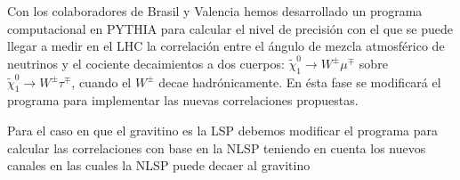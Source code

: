 \begin{itemize}
\begin{proyecto}
  Con los colaboradores de Brasil y Valencia hemos desarrollado un
  programa computacional en PYTHIA para calcular el nivel de precisión
  con el que se puede llegar a medir en el LHC la correlación entre el
  ángulo de mezcla atmosférico de neutrinos y el cociente decaimientos
  a dos cuerpos: $\tilde\chi_1^0\to W^\pm\mu^\mp$ sobre
  $\tilde\chi_1^0\to W^\pm\tau^\mp$, cuando el $W^\pm$ decae
  hadrónicamente. 
En ésta fase se modificará el programa para implementar las nuevas correlaciones propuestas.
\end{proyecto}

\begin{proyecto}
  Para el caso en que el gravitino es la LSP debemos modificar el
  programa para calcular las correlaciones con base en la NLSP
  teniendo en cuenta los nuevos canales en las cuales la NLSP puede
  decaer al gravitino
\end{proyecto}



\end{itemize}
